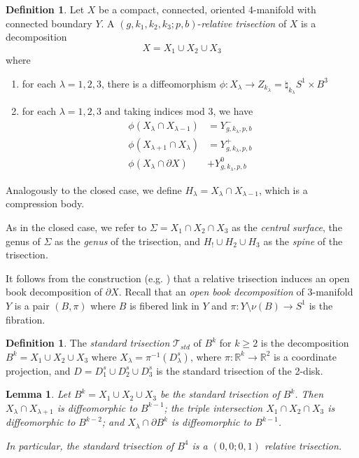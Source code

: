 \documentclass[11pt]{amsart}
\newtheorem{lemma}[theorem]{Lemma}
\theoremstyle{definition}
\newtheorem{definition}[theorem]{Definition}
\theoremstyle{remark}
\numberwithin{equation}{section}
\newcommand{\cT}{\mathcal{T}}
\newcommand{\RR}{\mathbb{R}}
\newcommand{\del}{\partial}
\begin{document}
\begin{definition}
Let $X$ be a compact, connected, oriented 4-manifold with connected boundary $Y$.  A $(g,k_1,k_2,k_3;p,b)$-{\it relative trisection} of $X$ is a decomposition
\[X = X_1 \cup X_2 \cup X_3\]
where
\begin{enumerate}
\item for each $\lambda = 1,2,3$, there is a diffeomorphism $\phi: X_{\lambda} \rightarrow Z_{k_{\lambda}} = \natural_{k_{\lambda}} S^1 \times B^3$ 
\item for each $\lambda = 1,2,3$ and taking indices mod 3, we have
\begin{align*}
\phi(X_{\lambda} \cap X_{\lambda - 1}) &= Y^-_{g,k_{\lambda},p,b} \\
\phi(X_{\lambda+1} \cap X_{\lambda}) &= Y^+_{g,k_{\lambda},p,b} \\
\phi(X_{\lambda} \cap \del X) &+ Y^0_{g,k_{\lambda},p,b}
\end{align*}
\end{enumerate}
Analogously to the closed case, we define $H_{\lambda} = X_{\lambda} \cap X_{\lambda-1}$, which is a compression body. 
\end{definition}

As in the closed case, we refer to $\Sigma = X_1 \cap X_2 \cap X_3$ as the {\it central surface}, the genus of $\Sigma$ as the {\it genus} of the trisection, and $H_! \cup H_2 \cup H_3$ as the {\it spine} of the trisection.
 
It follows from the construction (e.g. \cite[Lemma 11]{Relative-Tri}) that a relative trisection induces an open book decomposition of $\del X$.  Recall that an {\it open book decomposition} of 3-manifold $Y$ is a pair $(B,\pi)$ where $B$ is fibered link in $Y$ and $\pi: Y \setminus \nu(B) \rightarrow S^1$ is the fibration.

\begin{definition}
\label{def:std-tri-b4}
The {\it standard trisection} $\cT_{std}$ of $B^k$ for $k \geq 2$ is the decomposition $B^k = X_1 \cup X_2 \cup X_3$ where $X_{\lambda} = \pi^{-1}(D^s_{\lambda})$, where $\pi: \RR^k \rightarrow \RR^2$ is a coordinate projection, and $D = D^s_1 \cup D^s_2 \cup D^s_3$ is the standard trisection of the 2-disk.
\end{definition}

\begin{lemma}
Let $B^k = X_1 \cup X_2 \cup X_3$ be the standard trisection of $B^k$.  Then $X_{\lambda} \cap X_{\lambda+1}$ is diffeomorphic to $B^{k-1}$; the triple intersection $X_1 \cap X_2 \cap X_3$ is diffeomorphic to $B^{k-2}$; and $X_{\lambda} \cap \del B^k$ is diffeomorphic to $B^{k-1}$.

In particular, the standard trisection of $B^4$ is a $(0,0;0,1)$ relative trisection.
\end{lemma}
\end{document}
